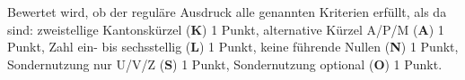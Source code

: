 \begin{bewertung}
Bewertet wird, ob der reguläre Ausdruck alle genannten Kriterien 
erfüllt, als da sind:
zweistellige Kantonskürzel ({\bf K}) 1 Punkt,
alternative Kürzel A/P/M ({\bf A}) 1 Punkt,
Zahl ein- bis sechsstellig ({\bf L}) 1 Punkt,
keine führende Nullen ({\bf N}) 1 Punkt,
Sondernutzung nur U/V/Z ({\bf S}) 1 Punkt,
Sondernutzung optional ({\bf O}) 1 Punkt.
\end{bewertung}

